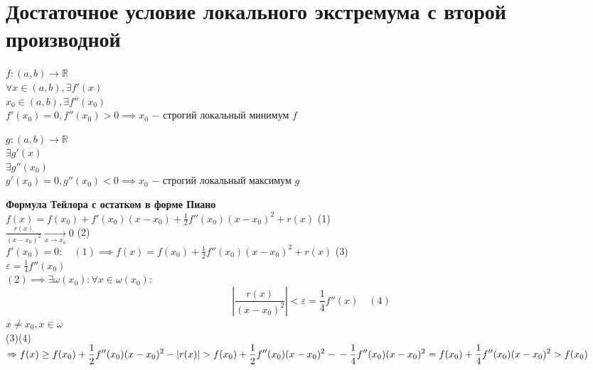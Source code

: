 



\section{Достаточное условие локального экстремума с второй производной}
\begin{theorem}
	$f: (a,b) \to \mathbb{R}$\\
	$\forall x \in (a,b), \exists f'(x)$ \\
	$x_0 \in (a,b), \exists f''(x_0)$ \\
	$f'(x_0)=0, f''(x_0)>0 \implies x_0$ $-$ строгий локальный минимум $f$
\end{theorem}
\begin{theorem}
	$g: (a,b)\to \mathbb{R}$ \\
	$\exists g'(x)$ \\
	$\exists g''(x_0)$ \\
	$g'(x_0)=0, g''(x_0)<0 \implies x_0$ $-$ строгий локальный максимум $g$
\end{theorem}
\begin{replacementproof}
	\textbf{Формула Тейлора с остатком в форме Пиано}\\
	$f(x)=f(x_0)+f'(x_0)(x-x_0)+\displaystyle\frac{1}{2}f''(x_0)(x-x_0)^2+r(x)$ (1)\\
	$\displaystyle\frac{r(x)}{(x-x_0)^2} \underset{x\to x_0}{\to} 0$ (2)\\
	$f'(x_0)=0: \quad (1) \implies f(x)=f(x_0)+\displaystyle\frac{1}{2}f''(x_0)(x-x_0)^2+r(x)$ (3)\\
	$\varepsilon=\displaystyle\frac{1}{4}f''(x_0)$\\
	$(2) \implies \exists \omega(x_0): \forall x \in \omega(x_0):$
	\[
	|\displaystyle\frac{r(x)}{(x-x_0)^2}|<\varepsilon=\displaystyle\frac{1}{4}f''(x) \quad (4)
	\]
	$x\neq x_0, x \in \omega$\\
	(3)(4) $\implies f(x)\ge f(x_0)+\displaystyle\frac{1}{2}f''(x_0)(x-x_0)^2-|r(x)|>f(x_0)+\displaystyle\frac{1}{2}f''(x_0)(x-x_0)^2-\\ -\displaystyle\frac{1}{4}f''(x_0)(x-x_0)^2=f(x_0)+\displaystyle\frac{1}{4}f''(x_0)(x-x_0)^2>f(x_0)$
\end{replacementproof}
